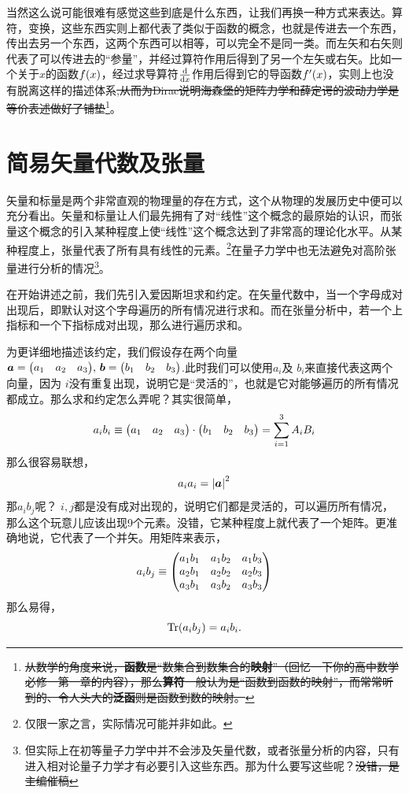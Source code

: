 \documentclass[12pt,a4paper,openany,twoside]{book}
\numberwithin{equation}{section}
\begin{document}
          当然这么说可能很难有感觉这些到底是什么东西，让我们再换一种方式来表达。算符，变换，这些东西实则上都代表了类似于函数的概念，也就是传进去一个东西，传出去另一个东西，这两个东西可以相等，可以完全不是同一类。而左矢和右矢则代表了可以传进去的“参量”，并经过算符作用后得到了另一个左矢或右矢。比如一个关于$x$的函数$f\qty(x)$，经过求导算符$\dv{x}$作用后得到它的导函数$f'\qty(x)$，实则上也没有脱离这样的描述体系\sout{,从而为Dirac说明海森堡的矩阵力学和薛定谔的波动力学是等价表述做好了铺垫}\footnote{\sout{从数学的角度来说，\textbf{函数}是“数集合到数集合的\textbf{映射}”（回忆一下你的高中数学必修一第一章的内容），那么\textbf{算符}一般认为是“函数到函数的映射”，而常常听到的、令人头大的\textbf{泛函}则是函数到数的映射。}}。

        \section{简易矢量代数及张量}
          矢量和标量是两个非常直观的物理量的存在方式，这个从物理的发展历史中便可以充分看出。矢量和标量让人们最先拥有了对“线性”这个概念的最原始的认识，而张量这个概念的引入某种程度上使“线性”这个概念达到了非常高的理论化水平。从某种程度上，张量代表了所有具有线性的元素。\footnote{仅限一家之言，实际情况可能并非如此。}在量子力学中也无法避免对高阶张量进行分析的情况\footnote{但实际上在初等量子力学中并不会涉及矢量代数，或者张量分析的内容，只有进入相对论量子力学才有必要引入这些东西。那为什么要写这些呢？\sout{没错，是主编催稿}}。

          在开始讲述之前，我们先引入爱因斯坦求和约定。在矢量代数中，当一个字母成对出现后，即默认对这个字母遍历的所有情况进行求和。而在张量分析中，若一个上指标和一个下指标成对出现，那么进行遍历求和。

          为更详细地描述该约定，我们假设存在两个向量$\vb*{a} = \mqty(\xmat*{a}{1}{3}), \, \vb*{b} = \mqty(\xmat*{b}{1}{3})$.此时我们可以使用$a_i$及 $b_i$来直接代表这两个向量，因为 $i$没有重复出现，说明它是“灵活的”，也就是它对能够遍历的所有情况都成立。那么求和约定怎么弄呢？其实很简单，
          \begin{equation*}
            a_i b_i \equiv \mqty(\xmat*{a}{1}{3}) \cdot \mqty(\xmat*{b}{1}{3})  = \sum_{i=1}^3{A_iB_i}
          \end{equation*} 
          那么很容易联想，
          \begin{equation*}
            a_i a_i = \abs{\vb*{a}}^2
          \end{equation*} 
          那$a_i b_j$呢？ $i,j$都是没有成对出现的，说明它们都是灵活的，可以遍历所有情况，那么这个玩意儿应该出现9个元素。没错，它某种程度上就代表了一个矩阵。更准确地说，它代表了一个并矢。用矩阵来表示，
          \begin{equation*}
            a_i b_j\equiv\mqty(
              a_1 b_1 & a_1 b_2 & a_1 b_3 \\
              a_2 b_1 & a_2 b_2 & a_2 b_3 \\
              a_3 b_1 & a_3 b_2 & a_3 b_3 
            )
          \end{equation*} 
          那么易得，
          \begin{equation}
            \Tr(a_i b_j) = a_i b_i.
          \end{equation}
\end{document}
